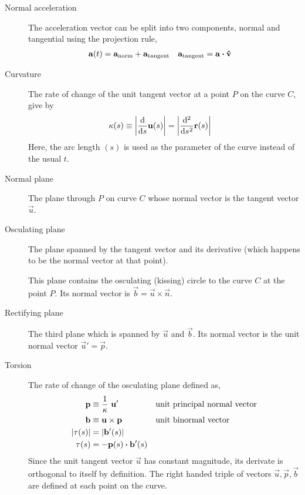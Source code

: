 \begin{description}
    \item[Normal acceleration] The acceleration vector can be split into two
        components, normal and tangential using the projection rule,
        \begin{align}
            \mathbf{a}(t)                 & = \mathbf{a}_{\text{norm}}
            + \mathbf{a}_{\text{tangent}} &
            \mathbf{a}_{\text{tangent}}   & = \mathbf{a} \boldsymbol{\cdot} \mathbf{\hat{v}}
        \end{align}

    \item[Curvature] The rate of change of the unit tangent vector at a point $ P $ on
        the curve $ C $, give by
        \begin{align}
            \kappa (s) & \equiv \abs{\diff*{\vec{u}(s)}{s}}
            = \abs{\diff*[2]{\vec{r}(s)}{s}}
        \end{align}
        Here, the arc length $ (s) $ is used as the parameter of the curve instead of the
        usual $ t $.

    \item[Normal plane] The plane through $ P $ on curve $ C $ whose normal vector is
        the tangent vector $ \vec{u} $.

    \item[Osculating plane] The plane spanned by the tangent vector and its derivative
        (which happens to be the normal vector at that point). \par
        This plane contains the osculating (kissing) circle to the curve $ C $ at the
        point $ P $. Its normal vector is $ \vec{b} = \vec{u} \times \vec{n} $.

    \item[Rectifying plane] The third plane which is spanned by $ \vec{u} $ and
        $ \vec{b} $. Its normal vector is the unit normal vector $ \vec{u}' = \vec{p} $.

    \item[Torsion] The rate of change of the osculating plane defined as,
        \begin{align}
            \vec{p}       & \equiv \frac{1}{\kappa}\ \vec{u}'   &
                          & \text{unit principal normal vector}   \\
            \vec{b}       & \equiv \vec{u} \times \vec{p}       &
                          & \text{unit binormal vector}           \\
            \abs{\tau(s)} & = \abs{\vec{b}'(s)}                   \\
            \tau (s)      & = -\vec{p}(s) \dotp \vec{b}'(s)
        \end{align}
        Since the unit tangent vector $ \vec{u} $ has constant magnitude, its derivate is
        orthogonal to itself by definition. The right handed triple of vectors
        $ \vec{u}, \vec{p}, \vec{b} $ are defined at each point on the curve.
\end{description}

